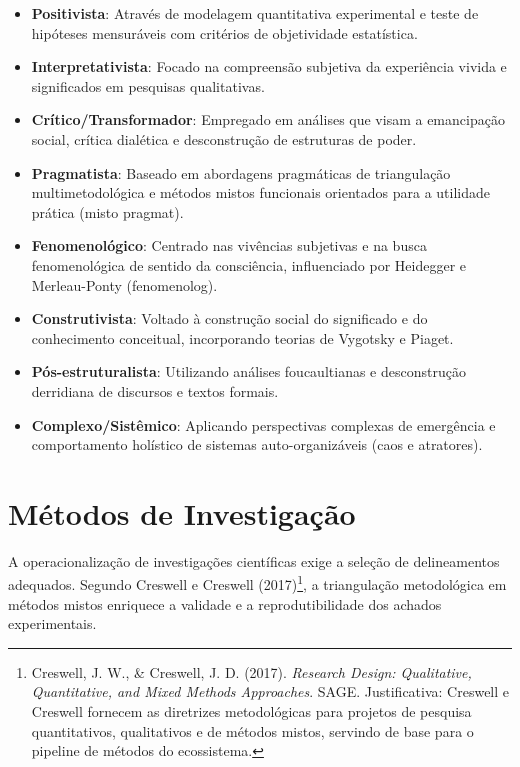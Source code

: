 \documentclass[12pt,a4paper,oneside]{abntex2}
\begin{document}
\begin{apendicesenv}
\begin{itemize}
    \item \textbf{Positivista}: Através de modelagem quantitativa experimental e teste de hipóteses mensuráveis com critérios de objetividade estatística.

    \item \textbf{Interpretativista}: Focado na compreensão subjetiva da experiência vivida e significados em pesquisas qualitativas.

    \item \textbf{Crítico/Transformador}: Empregado em análises que visam a emancipação social, crítica dialética e desconstrução de estruturas de poder.

    \item \textbf{Pragmatista}: Baseado em abordagens pragmáticas de triangulação multimetodológica e métodos mistos funcionais orientados para a utilidade prática (misto pragmat).

    \item \textbf{Fenomenológico}: Centrado nas vivências subjetivas e na busca fenomenológica de sentido da consciência, influenciado por Heidegger e Merleau-Ponty (fenomenolog).

    \item \textbf{Construtivista}: Voltado à construção social do significado e do conhecimento conceitual, incorporando teorias de Vygotsky e Piaget.

    \item \textbf{Pós-estruturalista}: Utilizando análises foucaultianas e desconstrução derridiana de discursos e textos formais.

    \item \textbf{Complexo/Sistêmico}: Aplicando perspectivas complexas de emergência e comportamento holístico de sistemas auto-organizáveis (caos e atratores).
\end{itemize}

\section{Métodos de Investigação}

A operacionalização de investigações científicas exige a seleção de delineamentos adequados. Segundo Creswell e Creswell (2017)\footnote{Creswell, J. W., \& Creswell, J. D. (2017). \textit{Research Design: Qualitative, Quantitative, and Mixed Methods Approaches}. SAGE. Justificativa: Creswell e Creswell fornecem as diretrizes metodológicas para projetos de pesquisa quantitativos, qualitativos e de métodos mistos, servindo de base para o pipeline de métodos do ecossistema.}, a triangulação metodológica em métodos mistos enriquece a validade e a reprodutibilidade dos achados experimentais.


\end{apendicesenv}
\end{document}
